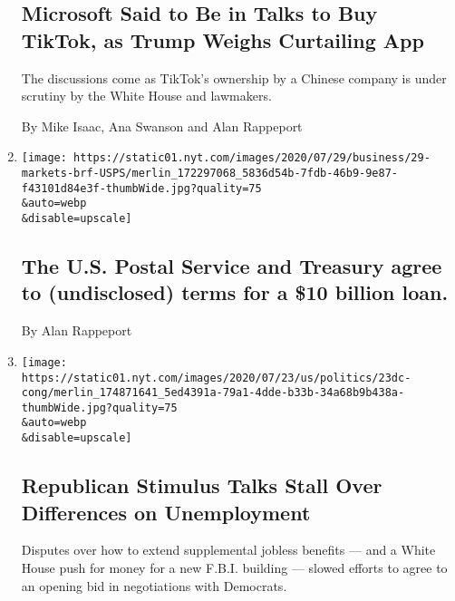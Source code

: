 \begin{enumerate}
{  \subsection{Microsoft Said to Be in Talks to Buy TikTok, as Trump
  Weighs Curtailing
  App}\label{microsoft-said-to-be-in-talks-to-buy-tiktok-as-trump-weighs-curtailing-app}}

  The discussions come as TikTok's ownership by a Chinese company is
  under scrutiny by the White House and lawmakers.

  By Mike Isaac, Ana Swanson and Alan Rappeport
\item
  \href{/live/2020/07/29/business/stock-market-today-coronavirus/the-us-postal-service-and-treasury-agree-to-undisclosed-terms-for-a-10-billion-loan}{}

  \texttt{[image: https://static01.nyt.com/images/2020/07/29/business/29-markets-brf-USPS/merlin\_172297068\_5836d54b-7fdb-46b9-9e87-f43101d84e3f-thumbWide.jpg?quality=75\\\&auto=webp\\\&disable=upscale]}

  \hypertarget{the-us-postal-service-and-treasury-agree-to-undisclosed-terms-for-a-10-billion-loan}{%
  \subsection{The U.S. Postal Service and Treasury agree to
  (undisclosed) terms for a \$10 billion
  loan.}\label{the-us-postal-service-and-treasury-agree-to-undisclosed-terms-for-a-10-billion-loan}}

  By Alan Rappeport
\item
  \href{/2020/07/23/us/politics/republicans-stimulus-coronavirus.html}{}

  \texttt{[image: https://static01.nyt.com/images/2020/07/23/us/politics/23dc-cong/merlin\_174871641\_5ed4391a-79a1-4dde-b33b-34a68b9b438a-thumbWide.jpg?quality=75\\\&auto=webp\\\&disable=upscale]}

  \hypertarget{republican-stimulus-talks-stall-over-differences-on-unemployment}{%
  \subsection{Republican Stimulus Talks Stall Over Differences on
  Unemployment}\label{republican-stimulus-talks-stall-over-differences-on-unemployment}}

  Disputes over how to extend supplemental jobless benefits --- and a
  White House push for money for a new F.B.I. building --- slowed
  efforts to agree to an opening bid in negotiations with Democrats.


\end{enumerate}
